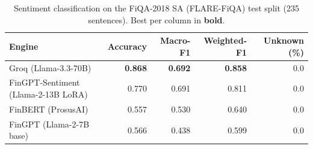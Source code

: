 \begin{table}[t]
  \centering
  \caption{Sentiment classification on the FiQA-2018 SA (FLARE-FiQA) test split (235 sentences). Best per column in \textbf{bold}.}
  \label{tab:sentiment-fiqa}
  \begin{tabular}{lrrrr}
    \toprule
    Engine & Accuracy & Macro-F1 & Weighted-F1 & Unknown (\%) \\
    \midrule
    Groq (Llama-3.3-70B) & \textbf{0.868} & \textbf{0.692} & \textbf{0.858} & 0.0 \\
    FinGPT-Sentiment (Llama-2-13B LoRA) & 0.770 & 0.691 & 0.811 & 0.0 \\
    FinBERT (ProsusAI) & 0.557 & 0.530 & 0.640 & 0.0 \\
    FinGPT (Llama-2-7B base) & 0.566 & 0.438 & 0.599 & 0.0 \\
    \bottomrule
  \end{tabular}
\end{table}
